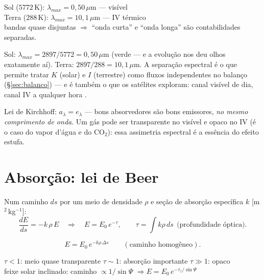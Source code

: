\documentclass[11pt]{article}
\begin{document}
\begin{noquadro}
Sol ($5772$\,K): $\lambda_{max} = 0{,}50\,\mu$m — visível\\
Terra ($288$\,K): $\lambda_{max} = 10{,}1\,\mu$m — IV térmico\\[2pt]
bandas quase disjuntas $\Rightarrow$ ``onda curta'' e ``onda longa''
são contabilidades separadas.
\end{noquadro}

\begin{exemplo}
Sol: $\lambda_{max} = 2897/5772 = 0{,}50\,\mu$m (verde — e a evolução nos
deu olhos exatamente aí). Terra: $2897/288 = 10{,}1\,\mu$m. A separação
espectral é o que permite tratar $K$ (solar) e $I$ (terrestre) como fluxos
independentes no balanço (\S\ref{sec:balanco}) — e é também o que os
satélites exploram: canal visível de dia, canal IV a qualquer hora
.
\end{exemplo}

Lei de Kirchhoff: $a_\lambda = e_\lambda$ — bons absorvedores são bons
emissores, \emph{no mesmo comprimento de onda}. Um gás pode ser
transparente no visível e opaco no IV (é o caso do vapor d'água e do
CO$_2$): essa assimetria espectral é a essência do efeito estufa.

\section{Absorção: lei de Beer}\label{sec:beer}


\begin{formadif}[dedução]
Num caminho $ds$ por um meio de densidade $\rho$ e seção de absorção
específica $k$ [m$^2$\,kg$^{-1}$]:
\[ \frac{dE}{ds} = -k\,\rho\,E
\quad\Longrightarrow\quad
E = E_0\,e^{-\tau},\qquad \tau = \int k\rho\,ds\ \ \text{(profundidade óptica)}. \]
\end{formadif}

\begin{formalivro}[Stull eq.~2.31c]
\[ E = E_0\,e^{-k\rho\,\Delta s}\qquad(\text{caminho homogêneo}). \]
\end{formalivro}

\begin{noquadro}
$\tau < 1$: meio quase transparente \quad $\tau \sim 1$: absorção
importante \quad $\tau \gg 1$: opaco\\
feixe solar inclinado: caminho $\propto 1/\sin\Psi$
$\Rightarrow E = E_0\,e^{-\tau_z/\sin\Psi}$
\end{noquadro}
\end{document}
